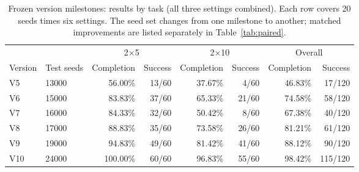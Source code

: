 \begin{table}[t]
\centering\small
\caption{Frozen version milestones: results by task (all three settings combined). Each row covers 20 seeds times six settings. The seed set changes from one milestone to another; matched improvements are listed separately in Table~\ref{tab:paired}.}
\label{tab:milestonesfull}
\begin{tabular}{llrrrrrr}
\toprule
& & \multicolumn{2}{c}{2×5} & \multicolumn{2}{c}{2×10} & \multicolumn{2}{c}{Overall}\\
\cmidrule(lr){3-4}\cmidrule(lr){5-6}\cmidrule(lr){7-8}
Version & Test seeds & Completion & Success & Completion & Success & Completion & Success\\
\midrule
V5 & 13000 & 56.00\% & 13/60 & 37.67\% & 4/60 & 46.83\% & 17/120 \\
V6 & 15000 & 83.83\% & 37/60 & 65.33\% & 21/60 & 74.58\% & 58/120 \\
V7 & 16000 & 84.33\% & 32/60 & 50.42\% & 8/60 & 67.38\% & 40/120 \\
V8 & 17000 & 88.83\% & 35/60 & 73.58\% & 26/60 & 81.21\% & 61/120 \\
V9 & 19000 & 94.83\% & 49/60 & 81.42\% & 41/60 & 88.12\% & 90/120 \\
V10 & 24000 & 100.00\% & 60/60 & 96.83\% & 55/60 & 98.42\% & 115/120 \\
\bottomrule
\end{tabular}
\end{table}

